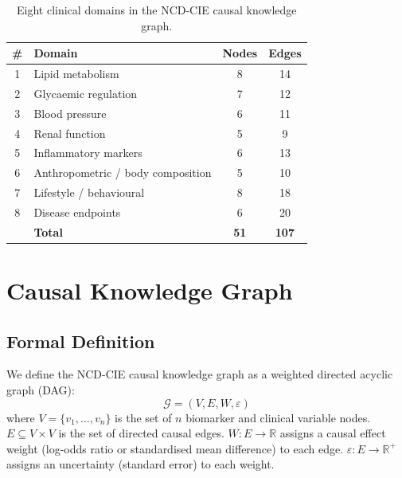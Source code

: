 \documentclass[runningheads]{llncs}
\begin{document}
\renewcommand{\arraystretch}{1.2}
\begin{table}[t]
\centering
\caption{Eight clinical domains in the NCD-CIE causal knowledge graph.}
\label{tab:domains}
\small
\begin{tabular}{@{}clcc@{}}
\toprule
\textbf{\#} & \textbf{Domain} & \textbf{Nodes} & \textbf{Edges} \\
\midrule
1 & Lipid metabolism        & 8  & 14 \\
2 & Glycaemic regulation    & 7  & 12 \\
3 & Blood pressure          & 6  & 11 \\
4 & Renal function          & 5  & 9  \\
5 & Inflammatory markers    & 6  & 13 \\
6 & Anthropometric / body composition & 5 & 10 \\
7 & Lifestyle / behavioural & 8  & 18 \\
8 & Disease endpoints       & 6  & 20 \\
\midrule
  & \textbf{Total}          & \textbf{51} & \textbf{107} \\
\bottomrule
\end{tabular}
\end{table}
\renewcommand{\arraystretch}{1.0}

\section{Causal Knowledge Graph}\label{sec:kg}

\subsection{Formal Definition}\label{sec:formal}

We define the NCD-CIE causal knowledge graph as a weighted directed
acyclic graph (DAG):
\begin{equation}\label{eq:graph}
\mathcal{G} = (V, E, W, \varepsilon)
\end{equation}
where $V=\{v_1,\ldots,v_n\}$ is the set of $n$ biomarker and clinical
variable nodes.
$E \subseteq V \times V$ is the set of directed causal edges.
$W: E \rightarrow \mathbb{R}$ assigns a causal effect weight
(log-odds ratio or standardised mean difference) to each edge.
$\varepsilon: E \rightarrow \mathbb{R}^+$ assigns an uncertainty
(standard error) to each weight.
\end{document}
